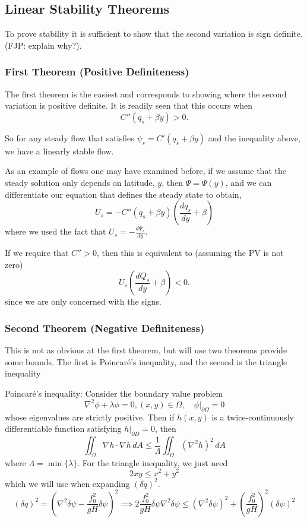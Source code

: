 \documentclass[12pt]{article}
\begin{document}
{    \subsection{Linear Stability Theorems}{
        To prove stability it is sufficient to show that the second variation is sign definite. (FJP: explain why?).

        \subsubsection{First Theorem (Positive Definiteness)}{
            The first theorem is the easiest and corresponds to showing where the second variation is positive definite.  It is readily seen that this occurs when
            $$
            C''(q_s + \beta y) > 0.
            $$

            So for any steady flow that satisfies $\psi_s = C'(q_s + \beta y)$ and the inequality above, we have a linearly stable flow.

            As an example of flows one may have examined before, if we assume that the steady solution only depends on latitude, $y$, then $\Psi = \Psi(y)$, and we can differentiate our equation that defines the steady state to obtain,
            $$
            U_s = -C''(q_s + \beta y) \left(\frac{dq_s}{dy} + \beta \right)
            $$
            where we used the fact that $U_s = - \frac{d \Psi_s}{dy}$.

            If we require that $C'' > 0$, then this is equivalent to (assuming the PV is not zero)
            $$
            U_s \left(\frac{d Q_s}{dy} + \beta \right) < 0.
            $$
            since we are only concerned with the signs.
        }

        \subsubsection{Second Theorem (Negative Definiteness)}{
            This is not as obvious at the first theorem, but will use two theorems provide some bounds. The first is Poincar\'e's inequality, and the second is the triangle inequality

            Poincar\'e's inequality: Consider the boundary value problem
            $$
                \nabla^2 \phi + \lambda \phi = 0, (x,y) \in \Omega, \quad
                \left. \phi \right|_{\partial \Omega} = 0
            $$
            whose eigenvalues are strictly positive. Then if $h(x,y)$ is a twice-continuously differentiable function satisfying $\left. h\right|_{\partial D} = 0$, then
            $$
                \iint_\Omega\nabla h \cdot\nabla h \, dA \le \frac{1}{\Lambda}\iint_\Omega (\nabla^2 h)^2 \, dA
            $$
            where $\Lambda = \min \{ \lambda \}$. For the triangle inequality, we just need
            $$
            	2xy \le x^2+y^2
            $$
            which we will use when expanding $(\delta q)^2$.
            $$
            	(\delta q)^2 = \left(\nabla^2\delta\psi - \frac{f_0^2}{gH}\delta\psi \right)^2 \implies 2\frac{f_0^2}{gH}\delta\psi\nabla^2\delta\psi \le (\nabla^2\delta\psi)^2 + \left(\frac{f_0^2}{gH} \right)^2(\delta\psi)^2 
            $$

}}}
\end{document}
